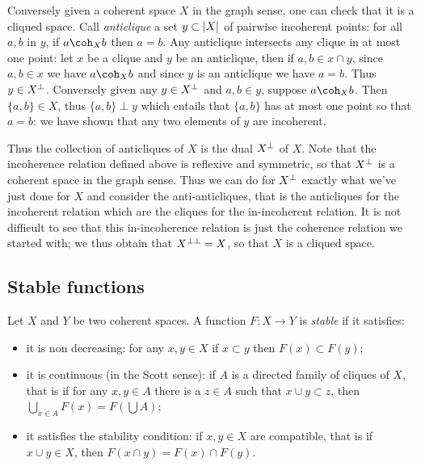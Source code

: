 Conversely given a coherent space \(X\) in the graph sense, one can
check that it is a cliqued space. Call \emph{anticlique} a set
\(y\subset \left|X\right|\) of pairwise incoherent points: for all \(a, b\) in
\(y\), if \(a\coh_X b\) then \(a=b\). Any anticlique intersects any
clique in at most one point: let \(x\) be a clique and \(y\) be an
anticlique, then if \(a,b\in x\cap y\), since \(a, b\in x\) we have
\(a\coh_X b\) and since \(y\) is an anticlique we have \(a = b\). Thus
\(y\in X^\bot\). Conversely given any \(y\in X^\bot\) and \(a, b\in y\),
suppose \(a\coh_X b\). Then \(\{a,b\}\in X\), thus \(\{a,b\}\perp y\)
which entails that \(\{a, b\}\) has at most one point so that \(a = b\):
we have shown that any two elements of \(y\) are incoherent.

Thus the collection of anticliques of \(X\) is the dual \(X^\bot\) of
\(X\). Note that the incoherence relation defined above is reflexive and
symmetric, so that \(X^\bot\) is a coherent space in the graph sense.
Thus we can do for \(X^\bot\) exactly what we've just done for \(X\) and
consider the anti-anticliques, that is the anticliques for the
incoherent relation which are the cliques for the in-incoherent
relation. It is not difficult to see that this in-incoherence relation
is just the coherence relation we started with; we thus obtain that
\(X^{\bot\bot} = X\), so that \(X\) is a cliqued space.

\subsection{Stable functions}\label{stable-functions}

\begin{definition}
Let $X$ and $Y$ be two coherent spaces. A function $F:X\longrightarrow Y$ is \emph{stable} if it satisfies:
\begin{itemize}
\item it is non decreasing: for any $x,y\in X$ if $x\subset y$ then $F(x)\subset F(y)$;
\item it is continuous (in the Scott sense): if $A$ is a directed family of cliques of $X$, that is if for any $x,y\in A$ there is a $z\in A$ such that $x\cup y\subset z$, then $\bigcup_{x\in A}F(x) = F(\bigcup A)$;
\item it satisfies the stability condition: if $x,y\in X$ are compatible, that is if $x\cup y\in X$, then $F(x\cap y) = F(x)\cap F(y)$.
\end{itemize}
\end{definition}

